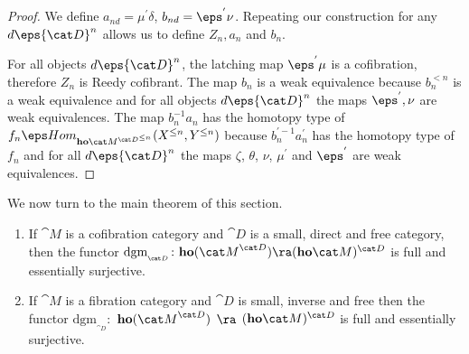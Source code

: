 \begin{proof}
We define $a_{nd} = {\mu}^{'}\delta$, $b_{nd} = {\eps}^{'}\nu$. Repeating our construction for any $d \eps {\cat D}^n$ allows us to define $Z_n, a_n$ and $b_n$.

For all objects $d \eps {\cat D}^n$, the latching map $\eps^{'}\mu$ is a cofibration, therefore $Z_n$ is Reedy cofibrant. The map $b_n$ is a weak equivalence because $b_n^{< n}$ is a weak equivalence and for all objects $d \eps {\cat D}^n$ the maps ${\eps}^{'}, \nu$ are weak equivalences. The map $b_n^{-1}a_n$ has the homotopy type of $f_n \eps Hom_{{\bf ho}{\cat M}^{{\cat D}^{\le n}}}(X^{\le n}, Y^{\le n})$ because $b_n^{' -1}a_n^{'}$ has the homotopy type of $f_n$ and for all $d \eps {\cat D}^n$ the maps $\zeta$, $\theta$, $\nu$, $\mu^{'}$ and $\eps^{'}$ are weak equivalences.
\end{proof}


We now turn to the main theorem of this section.

\begin{thm}[Cisinski]
\label{thm:freedirectdiagramrealization}
\mbox{}
\begin{enumerate}
\item
If ${\cat M}$ is a cofibration category and ${\cat D}$ is a small, direct and free category, then the functor $\mathrm{dgm}_{_{\cat D}} \colon {\bf ho}({\cat M}^{\cat D}) \ra ({\bf ho}{\cat M})^{\cat D}$ is full and essentially surjective.
\item
If ${\cat M}$ is a fibration category and ${\cat D}$ is small, inverse and free then the functor $\mathrm{dgm}_{_{\cat D}} \colon$ ${\bf ho}({\cat M}^{\cat D})$ $\ra$ $({\bf ho}{\cat M})^{\cat D}$ is full and essentially surjective.
\end{enumerate}
\end{thm}

